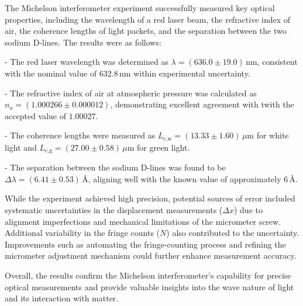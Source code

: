 The Michelson interferometer experiment successfully measured key optical properties, including the wavelength of a red laser beam, the refractive index of air, the coherence lengths of light packets, and the separation between the two sodium D-lines. The results were as follows:

- The red laser wavelength was determined as \(\lambda = (636.0 \pm 19.0)\,\text{nm}\), consistent with the nominal value of \(632.8\,\text{nm}\) within experimental uncertainty.  

- The refractive index of air at atmospheric pressure was calculated as \(n_a = (1.000266 \pm 0.000012)\), demonstrating excellent agreement with twith the accepted value of \(1.00027\). 

- The coherence lengths were measured as \(L_{\text{c,w}} = (13.33 \pm 1.60)\,\mu\text{m}\) for white light and \(L_{\text{c,g}} = (27.00 \pm 0.58)\,\mu\text{m}\) for green light.  

- The separation between the sodium D-lines was found to be \(\Delta \lambda = (6.41 \pm 0.53)\,\text{Å}\), aligning well with the known value of approximately \(6\,\text{Å}\).

While the experiment achieved high precision, potential sources of error included systematic uncertainties in the displacement measurements (\(\Delta x\)) due to alignment imperfections and mechanical limitations of the micrometer screw. Additional variability in the fringe counts (\(N\)) also contributed to the uncertainty. Improvements such as automating the fringe-counting process and refining the micrometer adjustment mechanism could further enhance measurement accuracy.

Overall, the results confirm the Michelson interferometer's capability for precise optical measurements and provide valuable insights into the wave nature of light and its interaction with matter.

